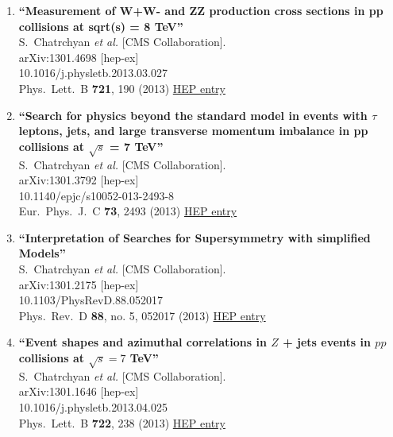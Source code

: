 \documentclass{article}
\begin{document}
\begin{enumerate}
\item%
{\bf ``Measurement of W+W- and ZZ production cross sections in pp collisions at sqrt(s) = 8 TeV''}
  \\{}S.~Chatrchyan {\it et al.} [CMS Collaboration].
  \\{}arXiv:1301.4698 [hep-ex]
    \\{}10.1016/j.physletb.2013.03.027
\\{}Phys.\ Lett.\ B {\bf 721}, 190 (2013) %
\href{http://inspirehep.net/record/1215317}{HEP entry}


\item%
{\bf ``Search for physics beyond the standard model in events with $\tau$ leptons, jets, and large transverse momentum imbalance in pp collisions at $\sqrt{s}$ = 7 TeV''}
  \\{}S.~Chatrchyan {\it et al.} [CMS Collaboration].
  \\{}arXiv:1301.3792 [hep-ex]
    \\{}10.1140/epjc/s10052-013-2493-8
\\{}Eur.\ Phys.\ J.\ C {\bf 73}, 2493 (2013) %
\href{http://inspirehep.net/record/1211187}{HEP entry}


\item%
{\bf ``Interpretation of Searches for Supersymmetry with simplified Models''}
  \\{}S.~Chatrchyan {\it et al.} [CMS Collaboration].
  \\{}arXiv:1301.2175 [hep-ex]
    \\{}10.1103/PhysRevD.88.052017
\\{}Phys.\ Rev.\ D {\bf 88}, no. 5, 052017 (2013) %
\href{http://inspirehep.net/record/1210032}{HEP entry}


\item%
{\bf ``Event shapes and azimuthal correlations in $Z$ + jets events in $pp$ collisions at $\sqrt{s}=7$ TeV''}
  \\{}S.~Chatrchyan {\it et al.} [CMS Collaboration].
  \\{}arXiv:1301.1646 [hep-ex]
    \\{}10.1016/j.physletb.2013.04.025
\\{}Phys.\ Lett.\ B {\bf 722}, 238 (2013) %
\href{http://inspirehep.net/record/1209721}{HEP entry}



\end{enumerate}
\end{document}
